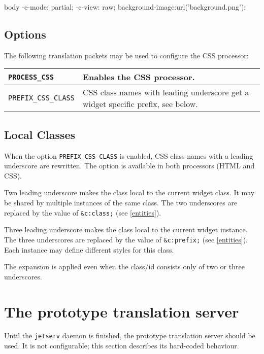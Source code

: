 \documentclass[a4paper,12pt]{article}
\begin{document}
\begin{verbatim*}
body {
  -c-mode: partial;
  -c-view: raw;
  background-image:url('background.png');
}
\end{verbatim*}

\subsection{Options}

The following translation packets may be used to configure the
CSS processor:

\begin{longtable}{|l|p{8cm}|}
\hline

\verb|PROCESS_CSS| & Enables the CSS processor. \\

\hline

\verb|PREFIX_CSS_CLASS| & CSS class names with leading underscore
get a widget specific prefix, see below. \\

\hline
\end{longtable}


\subsection{Local Classes}
\label{prefix_css_class}

When the option \verb|PREFIX_CSS_CLASS| is enabled, CSS class
names with a leading underscore are rewritten.  The option is
available in both processors (HTML and CSS).

Two leading underscore makes the class local to the current
widget class.  It may be shared by multiple instances of the same
class.  The two underscores are replaced by the value of
\verb|&c:class;| (see \ref{entities}).

Three leading underscore makes the class local to the current widget
instance.  The three underscores are replaced by the value of
\verb|&c:prefix;| (see \ref{entities}).  Each instance may define
different styles for this class.

The expansion is applied even when the class/id consists only of two
or three underscores.


\section{The prototype translation server}

Until the \texttt{jetserv} daemon is finished, the prototype
translation server should be used.  It is not configurable; this
section describes its hard-coded behaviour.
\end{document}
